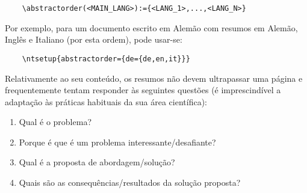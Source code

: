 
%

\begin{verbatim}
    \abstractorder(<MAIN_LANG>):={<LANG_1>,...,<LANG_N>}
\end{verbatim}

Por exemplo, para um documento escrito em Alemão com resumos em Alemão, Inglês e Italiano (por esta ordem), pode usar-se:
\begin{verbatim}
    \ntsetup{abstractorder={de={de,en,it}}}
\end{verbatim}

Relativamente ao seu conteúdo, os resumos não devem ultrapassar uma página e frequentemente tentam responder às seguintes questões (é imprescindível a adaptação às práticas habituais da sua área científica):

\begin{enumerate}
  \item Qual é o problema?
  \item Porque é que é um problema interessante/desafiante?
  \item Qual é a proposta de abordagem/solução?
  \item Quais são as consequências/resultados da solução proposta?
\end{enumerate}

%
%

